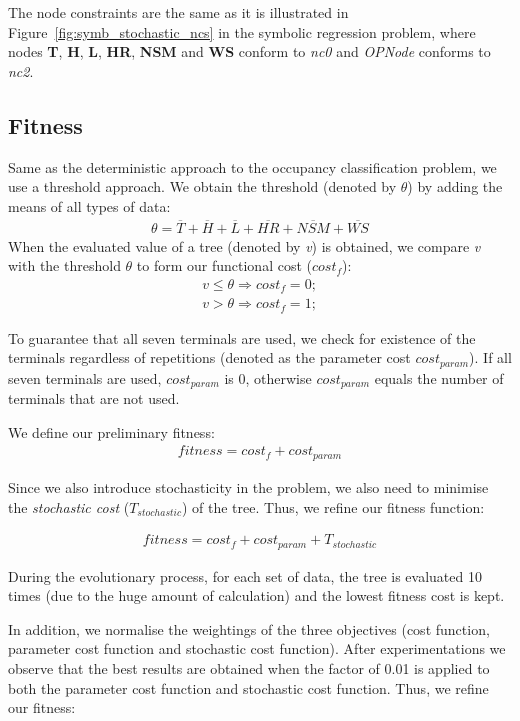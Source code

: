 The node constraints are the same as it is illustrated in Figure~\ref{fig:symb_stochastic_ncs} in the symbolic regression problem, where nodes \textbf{T}, \textbf{H}, \textbf{L}, \textbf{HR}, \textbf{NSM} and \textbf{WS} conform to \emph{nc0} and \emph{OPNode} conforms to \emph{nc2}. 

\subsection{Fitness}
Same as the deterministic approach to the occupancy classification problem, we use a threshold approach. We obtain the threshold (denoted by $\theta$) by adding the means of all types of data:
\begin{align*}
\theta = \overline{T} + \overline{H} + \overline{L} + \overline{HR} + \overline{NSM} + \overline{WS}
\end{align*}
When the evaluated value of a tree (denoted by \emph{v}) is obtained, we compare \emph{v} with the threshold $\theta$ to form our functional cost ($cost_f$):
\begin{align*}
v \leq \theta \Rightarrow cost_f = 0;\\
v > \theta \Rightarrow cost_f = 1;
\end{align*}

To guarantee that all seven terminals are used, we check for existence of the terminals regardless of repetitions (denoted as the parameter cost $cost_{param}$). If all seven terminals are used, $cost_{param}$ is 0, otherwise $cost_{param}$ equals the number of terminals that are not used. 

We define our preliminary fitness:
\begin{align}
fitness = cost_f + cost_{param}
\end{align}

Since we also introduce stochasticity in the problem, we also need to minimise the \emph{stochastic cost} ($T_{stochastic}$) of the tree. Thus, we refine our fitness function: 

\begin{align}
fitness = cost_f + cost_{param} + T_{stochastic}
\end{align}

During the evolutionary process, for each set of data, the tree is evaluated 10 times (due to the huge amount of calculation) and the lowest fitness cost is kept.

In addition, we normalise the weightings of the three objectives (cost function, parameter cost function and stochastic cost function). After experimentations we observe that the best results are obtained when the factor of 0.01 is applied to both the parameter cost function and stochastic cost function. Thus, we refine our fitness:

